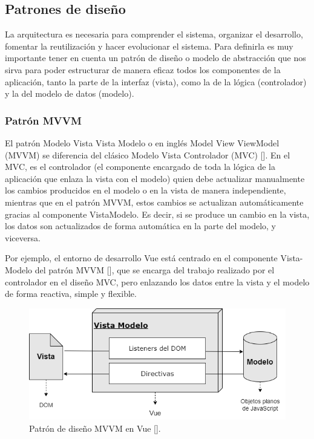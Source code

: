 \subsection{Patrones de diseño}

La arquitectura es necesaria para comprender el sistema, organizar el desarrollo, fomentar la reutilización y hacer evolucionar el sistema. Para definirla es muy importante tener en cuenta un patrón de diseño o modelo de abstracción que nos sirva para poder estructurar de manera eficaz todos los componentes de la aplicación, tanto la parte de la interfaz (vista), como la de la lógica (controlador) y la del modelo de datos (modelo).


\subsubsection{Patrón MVVM}

El patrón Modelo Vista Vista Modelo o en inglés Model View ViewModel (MVVM) se diferencia del clásico Modelo Vista Controlador (MVC) [\cite{45}]. En el MVC, es el controlador (el componente encargado de toda la lógica de la aplicación que enlaza la vista con el modelo) quien debe actualizar manualmente los cambios producidos en el modelo o en la vista de manera independiente, mientras que en el patrón MVVM, estos cambios se actualizan automáticamente gracias al componente VistaModelo. Es decir, si se produce un cambio en la vista, los datos son actualizados de forma automática en la parte del modelo, y viceversa.

Por ejemplo, el entorno de desarrollo Vue está centrado en el componente Vista-Modelo del patrón MVVM [\cite{49,47}], que se encarga del trabajo realizado por el controlador en el diseño MVC, pero enlazando los datos entre la vista y el modelo de forma reactiva, simple y flexible.

\begin{figure}[htbp]
\centering
\includegraphics[width=\textwidth]{Graphics/mvvm}
\caption{Patrón de diseño MVVM en Vue [\cite{47}].}
\label{fig:vmmv}
\end{figure}


